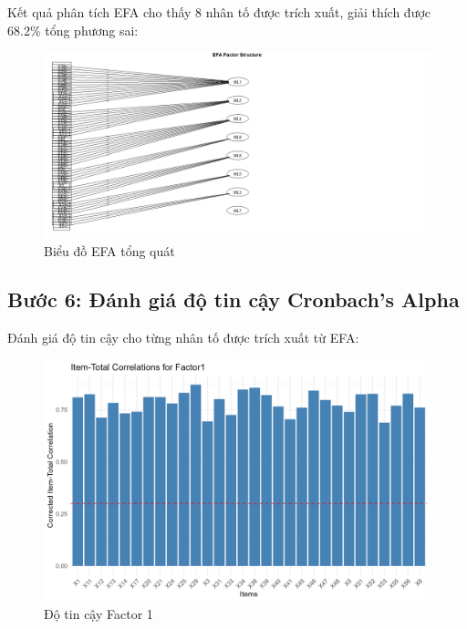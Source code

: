 Kết quả phân tích EFA cho thấy 8 nhân tố được trích xuất, giải thích được 68.2\% tổng phương sai:

\begin{figure}[h!]
    \centering
        \includegraphics[width=1.5\linewidth]{../../assets/images/EFA_ML.png}
        \caption{Biểu đồ EFA tổng quát}
        \label{fig:efa_general}
\end{figure}

\subsection{Bước 6: Đánh giá độ tin cậy Cronbach's Alpha}

Đánh giá độ tin cậy cho từng nhân tố được trích xuất từ EFA:

\begin{figure}[h!]
    \centering
        \includegraphics[width=0.55\linewidth]{../../assets/images/reliability_Factor1.png}
        \caption{Độ tin cậy Factor 1}
        \label{fig:reliability_f1}
\end{figure}

